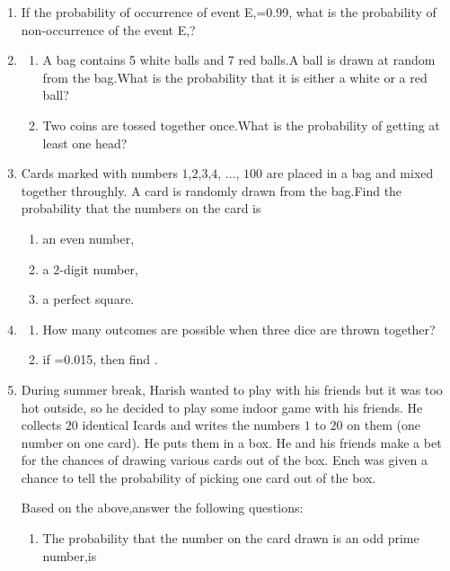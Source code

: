 \begin{enumerate}
\item  If the probability of occurrence of event E,=0.99, what is the probability of non-occurrence of the event E,?                   \item \begin{enumerate}
\item A bag contains 5 white balls and 7 red balls.A ball is drawn at random from the bag.What is the probability that it is either a white or a red ball?
\item Two coins are tossed together once.What is the probability of getting at least one head?
\end{enumerate}
\item Cards marked with numbers $1$,$2$,$3$,$4$, ..., $100$ are placed in a bag and mixed together throughly. A card is randomly drawn from the bag.Find the probability that the numbers on the card is                             \begin{enumerate}                                                                                                                     \item an even number,
\item a $2$-digit number,
\item a perfect square.                                         
\end{enumerate}
\item \begin{enumerate}
\item How many outcomes are possible when three dice are thrown together?
\item if =0.015, then find .
\end{enumerate}
\item  During summer break, Harish wanted to play with his friends but it was too hot outside, so he decided to play some indoor game with his friends. He collects $20$ identical Icards and writes the numbers $1$ to $20$ on them (one number on one card). He puts them in a box. He and his friends make a bet for the chances of drawing various cards out of the box. Ench was given a chance to tell the probability of picking one card out of the box.

Based on the above,answer the following questions:
\begin{enumerate}                                                                                                                                 \item The probability that the number on the card drawn is an odd prime number,is
\begin{enumerate}                           


\end{enumerate}
\end{enumerate}
\end{enumerate}
